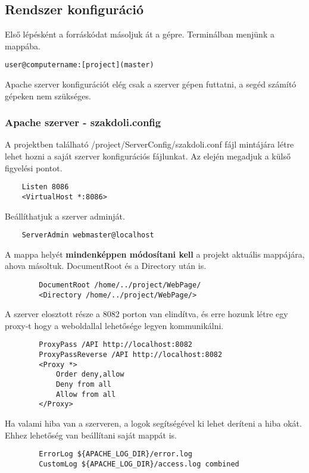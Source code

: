 \subsection{Rendszer konfiguráció}
Első lépésként a forráskódat másoljuk át a gépre.
Terminálban menjünk a mappába.
\begin{verbatim}
user@computername:[project](master)
\end{verbatim}
Apache szerver konfigurációt elég csak a szerver gépen futtatni, a segéd számító gépeken nem szükséges.
\subsubsection{Apache szerver - szakdoli.config}
	A projektben található /project/ServerConfig/szakdoli.conf fájl mintájára létre lehet hozni a saját szerver konfigurációs fájlunkat.
	\newline
	Az elején megadjuk a külső figyelési pontot.
	\begin{verbatim}
	Listen 8086
	<VirtualHost *:8086>
	\end{verbatim}

	Beállíthatjuk a szerver adminját.
	
	\begin{verbatim}
	ServerAdmin webmaster@localhost
	\end{verbatim}

	A mappa helyét \textbf{mindenképpen módosítani kell} a projekt aktuális mappájára, ahova másoltuk.
	DocumentRoot és a Directory után is.
	
	\begin{verbatim}
		DocumentRoot /home/../project/WebPage/
		<Directory /home/../project/WebPage/>
	\end{verbatim}
	
	A szerver elosztott része a 8082 porton van elindítva, és erre hozunk létre egy proxy-t hogy a weboldallal lehetősége legyen kommunikálni.
	
	\begin{verbatim}
		ProxyPass /API http://localhost:8082
		ProxyPassReverse /API http://localhost:8082
		<Proxy *>
		    Order deny,allow
		    Deny from all
		    Allow from all
		</Proxy> 
	\end{verbatim}
	
	Ha valami hiba van a szerveren, a logok segítségével ki lehet deríteni a hiba okát. Ehhez lehetőség van beállítani saját mappát is.

	\begin{verbatim}
		ErrorLog ${APACHE_LOG_DIR}/error.log
		CustomLog ${APACHE_LOG_DIR}/access.log combined
	\end{verbatim}

